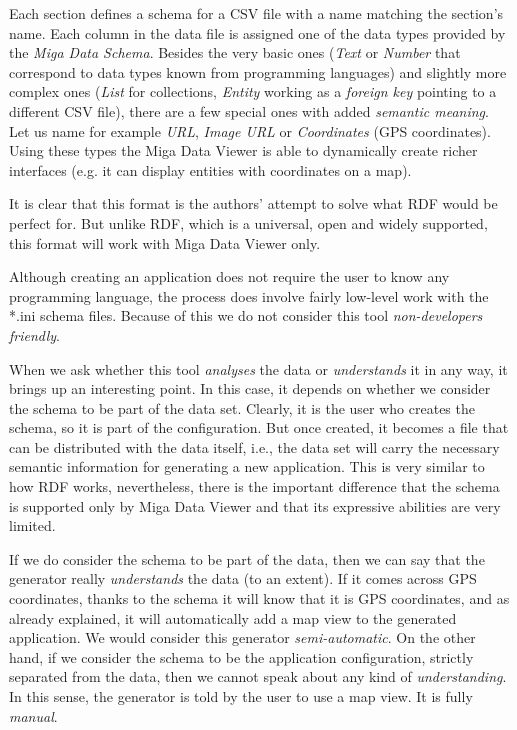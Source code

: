 Each section defines a schema for a CSV file with a name matching the section's name. Each column in the data file is assigned one of the data types provided by the \emph{Miga Data Schema}. Besides the very basic ones (\emph{Text} or \emph{Number} that correspond to data types known from programming languages) and slightly more complex ones (\emph{List} for collections, \emph{Entity} working as a \emph{foreign key} pointing to a different CSV file), there are a few special ones with added \emph{semantic meaning}. Let us name for example \emph{URL}, \emph{Image URL} or \emph{Coordinates} (GPS coordinates). Using these types the Miga Data Viewer is able to dynamically create richer interfaces (e.g. it can display entities with coordinates on a map).

It is clear that this format is the authors' attempt to solve what RDF would be perfect for. But unlike RDF, which is a universal, open and widely supported, this format will work with Miga Data Viewer only.

Although creating an application does not require the user to know any programming language, the process does involve fairly low-level work with the *.ini schema files. Because of this we do not consider this tool \emph{non-developers friendly}.

When we ask whether this tool \emph{analyses} the data or \emph{understands} it in any way, it brings up an interesting point. In this case, it depends on whether we consider the schema to be part of the data set. Clearly, it is the user who creates the schema, so it is part of the configuration. But once created, it becomes a file that can be distributed with the data itself, i.e., the data set will carry the necessary semantic information for generating a new application. This is very similar to how RDF works, nevertheless, there is the important difference that the schema is supported only by Miga Data Viewer and that its expressive abilities are very limited.

If we do consider the schema to be part of the data, then we can say that the generator really \emph{understands} the data (to an extent). If it comes across GPS coordinates, thanks to the schema it will know that it is GPS coordinates, and as already explained, it will automatically add a map view to the generated application. We would consider this generator \emph{semi-automatic}. On the other hand, if we consider the schema to be the application configuration, strictly separated from the data, then we cannot speak about any kind of \emph{understanding}. In this sense, the generator is told by the user to use a map view. It is fully \emph{manual}.

